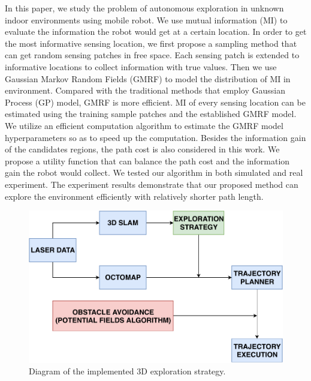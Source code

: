 \cite{Wang2018}
In this paper, we study the problem of autonomous
exploration in unknown indoor environments using mobile
robot. We use mutual information (MI) to evaluate the information the robot would get at a certain location. In order to
get the most informative sensing location, we first propose a
sampling method that can get random sensing patches in free
space. Each sensing patch is extended to informative locations
to collect information with true values. Then we use Gaussian
Markov Random Fields (GMRF) to model the distribution of
MI in environment. Compared with the traditional methods that
employ Gaussian Process (GP) model, GMRF is more efficient.
MI of every sensing location can be estimated using the training
sample patches and the established GMRF model. We utilize an
efficient computation algorithm to estimate the GMRF model
hyperparameters so as to speed up the computation. Besides
the information gain of the candidates regions, the path cost is
also considered in this work. We propose a utility function that
can balance the path cost and the information gain the robot
would collect. We tested our algorithm in both simulated and
real experiment. The experiment results demonstrate that our
proposed method can explore the environment efficiently with
relatively shorter path length.


\begin{figure}[t!]
	\centering
	\includegraphics[width=1.0\columnwidth]{./pictures/3D_strategy.pdf}	
	\caption{Diagram of the implemented 3D exploration strategy.}
	\label{fig:3D_strategy}
\end{figure}
